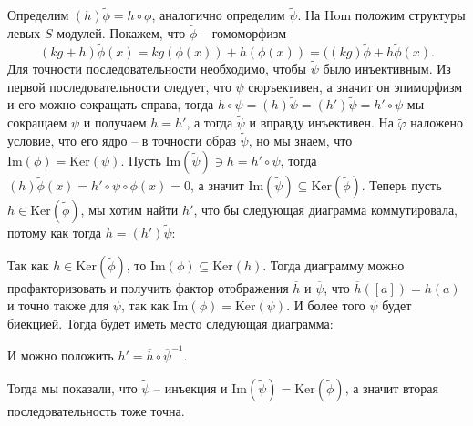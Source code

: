 \documentclass{article}
\begin{document}
\begin{enumerate}
        Определим $(h)\widetilde\phi=h\circ\phi$, аналогично определим $\widetilde\psi$. На Hom
        положим структуры левых $S$-модулей. Покажем, что $\widetilde\phi$ – гомоморфизм
        \[(kg+h)\widetilde\phi(x)=kg(\phi(x))+h(\phi(x))=((kg)\widetilde\phi+h\widetilde\phi(x).\]
        Для точности последовательности необходимо, чтобы $\widetilde\psi$ было инъективным.
        Из первой последовательности следует, что $\psi$ сюръективен, а значит он
        эпиморфизм и его можно сокращать справа, тогда $h\circ\psi=(h)\widetilde\psi=
        (h')\widetilde\psi=h'\circ\psi$ мы сокращаем $\psi$ и получаем $h=h'$, а тогда
        $\widetilde\psi$ и вправду инъективен. На $\widetilde\varphi$ наложено условие, что
        его ядро – в точности образ $\widetilde\psi$, но мы знаем, что $\text{Im}(\phi)=\text{Ker}(\psi)$.
        Пусть $\text{Im}(\widetilde\psi)\ni h=h'\circ\psi$, тогда $(h)\widetilde\phi(x)=h'\circ\psi\circ\phi(x)=0$,
        а значит $\text{Im}(\widetilde\psi)\subseteq\text{Ker}(\widetilde\phi)$. Теперь пусть
        $h\in\text{Ker}(\widetilde\phi)$, мы хотим найти $h'$, что бы следующая диаграмма коммутировала, потому
        как тогда $h=(h')\widetilde\psi$:
        \begin{center}\end{center}
        Так как $h\in\text{Ker}(\widetilde\phi)$, то $\text{Im}(\phi)\subseteq\text{Ker}(h)$. Тогда диаграмму
        можно профакторизовать и получить фактор отображения $\overline h$ и $\overline\psi$, что $\overline h([a]) = h(a)$
        и точно также для $\psi$, так как $\text{Im}(\phi)=\text{Ker}(\psi)$. И более того $\overline\psi$ будет
        биекцией. Тогда будет иметь место следующая диаграмма:
        \begin{center}\end{center}
        И можно положить $h'=\overline h\circ\overline\psi^{-1}$.

        Тогда мы показали, что $\widetilde\psi$ – инъекция и $\text{Im}(\widetilde\psi)=\text{Ker}
        (\widetilde\phi)$, а значит вторая последовательность тоже точна.


\end{enumerate}
\end{document}
